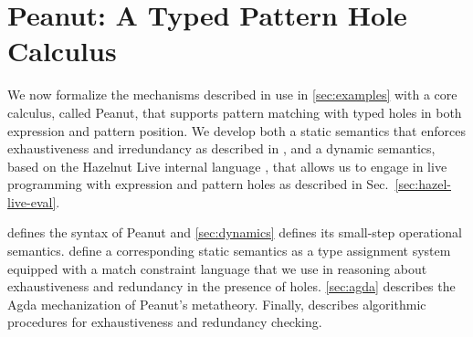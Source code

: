 \section{Peanut: A Typed Pattern Hole Calculus}
\label{sec:formalism}
We now formalize the mechanisms described in use in \autoref{sec:examples} with a core calculus, called Peanut, that supports pattern matching with typed holes in both expression and pattern position. We develop both a static semantics that enforces exhaustiveness and irredundancy as described in , and a dynamic semantics, based on the Hazelnut Live internal language \cite{DBLP:journals/pacmpl/OmarVCH19}, that allows us to engage in live programming with expression and pattern holes as described in Sec.~\ref{sec:hazel-live-eval}.


 defines the syntax of Peanut and \autoref{sec:dynamics} defines its small-step operational semantics.  define a corresponding static semantics as a type assignment system equipped with a match constraint language that we use in reasoning about exhaustiveness and redundancy in the presence of
holes. \autoref{sec:agda} describes the Agda mechanization of Peanut's metatheory. Finally,  describes algorithmic procedures for exhaustiveness and redundancy checking.




